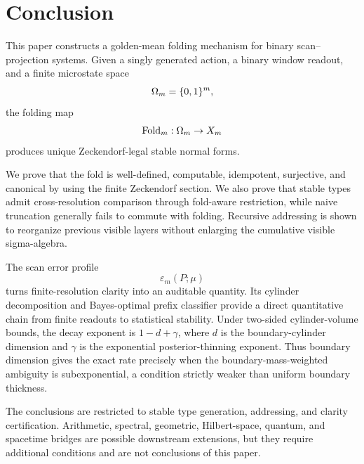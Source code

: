 \section{Conclusion}
\label{sec:conclusion}

This paper constructs a golden-mean folding mechanism for binary scan--projection systems.  Given a singly generated action, a binary window readout, and a finite microstate space
\[
\Omega_m=\{0,1\}^m,
\]
the folding map
\[
\operatorname{Fold}_m:\Omega_m\to X_m
\]
produces unique Zeckendorf-legal stable normal forms.

We prove that the fold is well-defined, computable, idempotent, surjective, and canonical by using the finite Zeckendorf section.  We also prove that stable types admit cross-resolution comparison through fold-aware restriction, while naive truncation generally fails to commute with folding.  Recursive addressing is shown to reorganize previous visible layers without enlarging the cumulative visible sigma-algebra.

The scan error profile
\[
\varepsilon_m(P;\mu)
\]
turns finite-resolution clarity into an auditable quantity.  Its cylinder decomposition and Bayes-optimal prefix classifier provide a direct quantitative chain from finite readouts to statistical stability.  Under two-sided cylinder-volume bounds, the decay exponent is \(1-d+\gamma\), where \(d\) is the boundary-cylinder dimension and \(\gamma\) is the exponential posterior-thinning exponent.  Thus boundary dimension gives the exact rate precisely when the boundary-mass-weighted ambiguity is subexponential, a condition strictly weaker than uniform boundary thickness.

The conclusions are restricted to stable type generation, addressing, and clarity certification.  Arithmetic, spectral, geometric, Hilbert-space, quantum, and spacetime bridges are possible downstream extensions, but they require additional conditions and are not conclusions of this paper.

